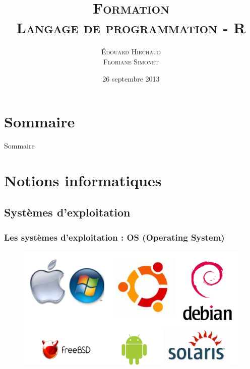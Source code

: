 \documentclass[table,svgnames,hyperref={pdfpagemode=FullScreen}]{beamer}
\title{\textsc{Formation \\ Langage de programmation - R}}
\date{26 septembre 2013}
\author{\textsc{Édouard Hirchaud \\ Floriane Simonet}}
\begin{document}
\begin{frame}
	\maketitle
\end{frame}
	

\section*{Sommaire}
\begin{frame}{Sommaire}
	\small \tableofcontents
\end{frame}

\section{Notions informatiques}

\subsection{Systèmes d'exploitation}
\begin{frame}
	\frametitle{Les systèmes d'exploitation : OS (Operating System)}
	\begin{figure}
		\includegraphics[scale=0.55]{image/OSimage.png}
	\end{figure}
\end{frame}
\end{document}
